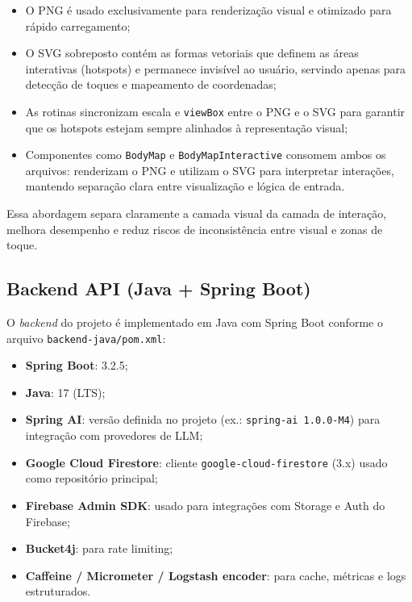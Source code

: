 \begin{itemize}
    \item O PNG é usado exclusivamente para renderização visual e otimizado para rápido carregamento;
    \item O SVG sobreposto contém as formas vetoriais que definem as áreas interativas (hotspots) e permanece invisível ao usuário, servindo apenas para detecção de toques e mapeamento de coordenadas;
    \item As rotinas sincronizam escala e \texttt{viewBox} entre o PNG e o SVG para garantir que os hotspots estejam sempre alinhados à representação visual;
    \item Componentes como \texttt{BodyMap} e \texttt{BodyMapInteractive} consomem ambos os arquivos: renderizam o PNG e utilizam o SVG para interpretar interações, mantendo separação clara entre visualização e lógica de entrada.
\end{itemize}

Essa abordagem separa claramente a camada visual da camada de interação, melhora desempenho e reduz riscos de inconsistência entre visual e zonas de toque.

\subsection{Backend API (Java + Spring Boot)}

O \textit{backend} do projeto é implementado em Java com Spring Boot conforme o arquivo \texttt{backend-java/pom.xml}:

\begin{itemize}
    \item \textbf{Spring Boot}: 3.2.5;
    \item \textbf{Java}: 17 (LTS);
    \item \textbf{Spring AI}: versão definida no projeto (ex.: \texttt{spring-ai 1.0.0-M4}) para integração com provedores de LLM;
    \item \textbf{Google Cloud Firestore}: cliente \texttt{google-cloud-firestore} (3.x) usado como repositório principal;
    \item \textbf{Firebase Admin SDK}: usado para integrações com Storage e Auth do Firebase;
    \item \textbf{Bucket4j}: para rate limiting;
    \item \textbf{Caffeine / Micrometer / Logstash encoder}: para cache, métricas e logs estruturados.
\end{itemize}

